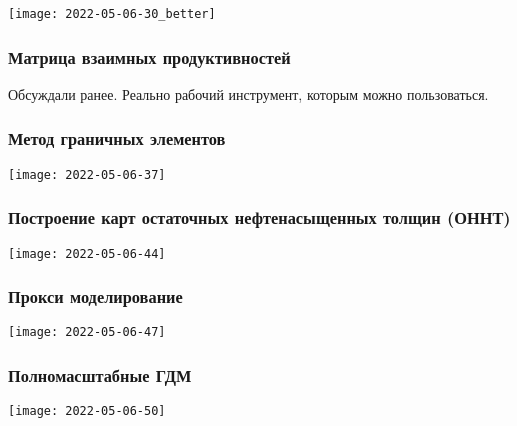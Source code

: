 \documentclass[main.tex]{subfiles}
\begin{document}
\texttt{[image: 2022-05-06-30\_better]}







\subsubsection{Матрица взаимных продуктивностей}

Обсуждали ранее. Реально рабочий инструмент, которым можно пользоваться.

\subsubsection{Метод граничных элементов}

\texttt{[image: 2022-05-06-37]}







\subsubsection{Построение карт остаточных нефтенасыщенных толщин (ОННТ)}

\texttt{[image: 2022-05-06-44]}



\subsubsection{Прокси моделирование}

\texttt{[image: 2022-05-06-47]}



\subsubsection{Полномасштабные ГДМ}

\texttt{[image: 2022-05-06-50]}

\end{document}

